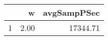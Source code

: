 \begin{table}[h]
\centering
\begin{tabular}{rrr}
  \hline
 & w & avgSampPSec \\ 
  \hline
1 & 2.00 & 17344.71 \\ 
   \hline
\end{tabular}
\end{table}
